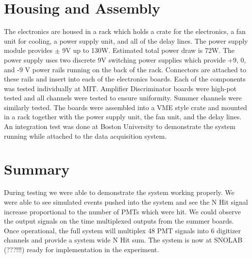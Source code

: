 \documentclass[preprint,12pt]{elsarticle}
\begin{document}
\section{Housing and Assembly}
\label{Housing}
The electronics are housed in a rack which holds a crate for the electronics, a fan unit for cooling, a power supply unit, and all of the delay lines.  The power supply module provides $\pm$ 9V up to 130W.  Estimated total power draw is 72W.  The power supply uses two discrete 9V switching power supplies which provide +9, 0, and -9 V power rails running on the back of the rack.  Connectors are attached to these rails and insert into each of the electronics boards.  Each of the components was tested individually at MIT.  Amplifier Discriminator boards were high-pot tested and all channels were tested to ensure uniformity.  Summer channels were similarly tested.  The boards were assembled into a VME style crate and mounted in a rack together with the power supply unit, the fan unit, and the delay lines.  An integration test was done at Boston University to demonstrate the system running while attached to the data acquisition system.

\section{Summary}
\label{Summary}
During testing we were able to demonstrate the system working properly.  We were able to see simulated events pushed into the system and see the N Hit signal increase proportional to the number of PMTs which were hit.  We could observe the output signals on the time multiplexed outputs from the summer boards.  Once operational, the full system will multiplex 48 PMT signals into 6 digitizer channels and provide a system wide N Hit sum.  The system is now at SNOLAB (???!!!) ready for implementation in the experiment.
\end{document}
